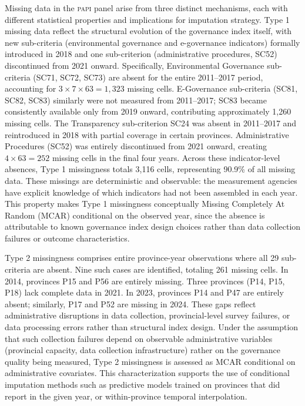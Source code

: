 \documentclass[12pt,a4paper]{article}
\newcommand{\PAPI}{\textsc{papi}\xspace}
\begin{document}
Missing data in the \PAPI panel arise from three distinct mechanisms, each with different statistical properties and implications for imputation strategy. Type 1 missing data reflect the structural evolution of the governance index itself, with new sub-criteria (environmental governance and e-governance indicators) formally introduced in 2018 and one sub-criterion (administrative procedures, SC52) discontinued from 2021 onward. Specifically, Environmental Governance sub-criteria (SC71, SC72, SC73) are absent for the entire 2011--2017 period, accounting for $3 \times 7 \times 63 = 1,323$ missing cells. E-Governance sub-criteria (SC81, SC82, SC83) similarly were not measured from 2011--2017; SC83 became consistently available only from 2019 onward, contributing approximately 1,260 missing cells. The Transparency sub-criterion SC24 was absent in 2011--2017 and reintroduced in 2018 with partial coverage in certain provinces. Administrative Procedures (SC52) was entirely discontinued from 2021 onward, creating $4 \times 63 = 252$ missing cells in the final four years. Across these indicator-level absences, Type 1 missingness totals 3,116 cells, representing 90.9\% of all missing data. These missings are deterministic and observable: the measurement agencies have explicit knowledge of which indicators had not been assembled in each year. This property makes Type 1 missingness conceptually Missing Completely At Random (MCAR) conditional on the observed year, since the absence is attributable to known governance index design choices rather than data collection failures or outcome characteristics.

Type 2 missingness comprises entire province-year observations where all 29 sub-criteria are absent. Nine such cases are identified, totaling 261 missing cells. In 2014, provinces P15 and P56 are entirely missing. Three provinces (P14, P15, P18) lack complete data in 2021. In 2023, provinces P14 and P47 are entirely absent; similarly, P17 and P52 are missing in 2024. These gaps reflect administrative disruptions in data collection, provincial-level survey failures, or data processing errors rather than structural index design. Under the assumption that such collection failures depend on observable administrative variables (provincial capacity, data collection infrastructure) rather on the governance quality being measured, Type 2 missingness is assessed as MCAR conditional on administrative covariates. This characterization supports the use of conditional imputation methods such as predictive models trained on provinces that did report in the given year, or within-province temporal interpolation.
\end{document}
